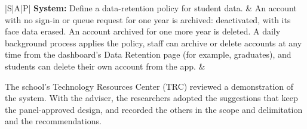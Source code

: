 \documentclass[12pt,letterpaper]{article}
\newcommand{\pg}[1]{\large #1}
\begin{document}
\begin{longtable}{|S|A|P|}
\textbf{System:}\newline
Define a data-retention policy for student data.
&
An account with no sign-in or queue request for one year is archived:
deactivated, with its face data erased. An account archived for one
more year is deleted. A daily background process applies the policy,
staff can archive or delete accounts at any time from the dashboard's
Data Retention page (for example, graduates), and students can delete
their own account from the app.
&
\pg{\pageref{cr:retention}} \\ \hline

\end{longtable}

\normalsize
\vspace{1em}

\vspace{0.5em}
\noindent The school's Technology Resources Center (TRC) reviewed a
demonstration of the system. With the adviser, the researchers adopted
the suggestions that keep the panel-approved design, and recorded the
others in the scope and delimitation and the recommendations.
\end{document}
